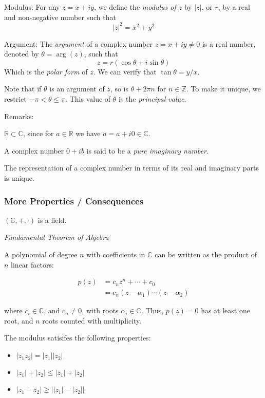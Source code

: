 \documentclass[12pt]{article}
\begin{document}
\begin{compactenum}[i)]
\setcounter{enumi}{5}
\item Modulus: For any $z = x + iy$, we define the \emph{modulus of $z$} by $|z|$, or $r$, by
    a real and non-negative number such that
    \[
    |z|^{2} = x^{2} + y^{2}
    \]
\item Argument: The \emph{argument} of a complex number $z = x + iy \ne 0$
    is a real number, denoted by $\theta = \arg(z)$, such that
    \[
        z = r(\cos \theta + i \sin \theta)
    \]
    Which is the \emph{polar form} of $z$. We can verify
    that $\tan\theta = y/x$.
\end{compactenum}

Note that if $\theta$ is an argument of $z$, so is $\theta + 2\pi n$ for $n \in \mathbb{Z}$.
To make it unique, we restrict $-\pi < \theta \le \pi$.
This value of $\theta$ is the \emph{principal value}.

Remarks:
\begin{compactenum}[(1)]
\item $\mathbb{R} \subset \mathbb{C}$, since for $a \in \mathbb{R}$ we have
    $a = a + i 0 \in \mathbb{C}$.
\item A complex number $0 + ib$ is said to be a \emph{pure imaginary number}.
\item The representation of a complex number in terms
    of its real and imaginary parts is unique.
\end{compactenum}

\subsubsection*{More Properties / Consequences}
\begin{compactenum}[(i)]
\setlength{\parskip}{4pt}
\item $(\mathbb{C},+,\cdot)$ is a field.
\item \emph{Fundamental Theorem of Algebra}

    A polynomial of degree $n$ with coefficients in $\mathbb{C}$
    can be written as the product of $n$ linear factors:

    \[
        \begin{aligned}
            p(z) &= c_n z^{n} + \cdots + c_{0} \\
                &= c_n (z - \alpha _1)\cdots(z - \alpha_2)
        \end{aligned}
    \]
    
    where $c_i \in \mathbb{C}$, and $c_n \ne 0$, with roots $\alpha_i \in \mathbb{C}$.
    Thus, $p(z) = 0$ has at least one root,
    and $n$ roots counted with multiplicity.
\item The modulus satisifes the following properties:
    \begin{itemize}
        \item $|z_{1}z_{2}| = |z_{1}||z_{2}|$
        \item $|z_{1}| + |z_{2}| \le |z_{1}| + |z_{2}|$
        \item $|z_{1} - z_{2}| \ge \left||z_{1}| - |z_{2}|\right|$
    \end{itemize}
\end{compactenum}
\end{document}
